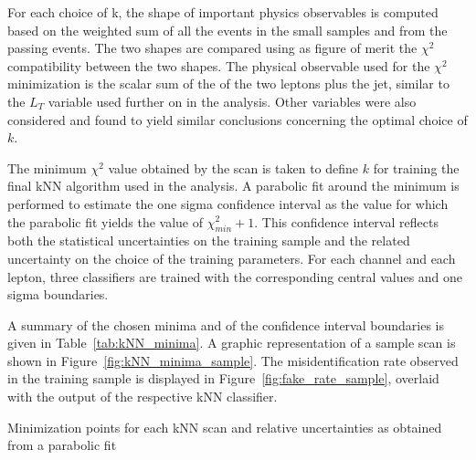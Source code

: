 For each choice of k, the shape of important physics observables is computed based on the weighted sum of all the events in the small samples and from the passing events. The two shapes are compared using as figure of merit the $\chi^2$ compatibility between the two shapes. The physical observable used for the $\chi^2$ minimization is the scalar sum of the \pT of the two leptons plus the jet, similar to the $L_T$ variable used further on in the analysis. Other variables were also considered and found to yield similar conclusions concerning the optimal choice of $k$.%

The minimum $\chi^2$ value obtained by the scan is taken to define $k$ for training the final kNN algorithm used in the analysis. %
A parabolic fit around the minimum is performed to estimate the one sigma confidence interval as the value for which the parabolic fit yields the value of $\chi^2_{min} + 1$. %
This confidence interval reflects both the statistical uncertainties on the training sample and the related uncertainty on the choice of the training parameters. For each channel and each lepton, three classifiers are trained with the corresponding central values and one sigma boundaries.

A summary of the chosen minima and of the confidence interval boundaries is given in Table~\ref{tab:kNN_minima}. A graphic representation of a sample scan is shown in Figure~\ref{fig:kNN_minima_sample}. The misidentification rate observed in the training sample is displayed in Figure~\ref{fig:fake_rate_sample}, overlaid with the output of the respective kNN classifier.


\begin{table}

\caption{Minimization points for each kNN scan and relative uncertainties as obtained from a parabolic fit}

\label{tab:kNN_minima}
\end{table}

